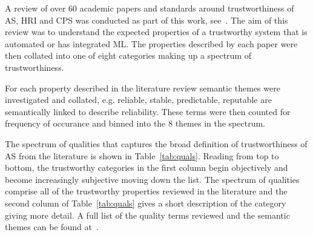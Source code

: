 A review of over 60 academic papers and standards around trustworthiness of AS, HRI and CPS was conducted as part of this work, see~\cite{tsl_git}. The aim of this review was to understand the expected properties of a trustworthy system that is automated or has integrated ML. The properties described by each paper were then collated into one of eight categories making up a spectrum of trustworthiness.

For each property described in the literature review semantic themes were investigated and collated, e.g. reliable, stable, predictable, reputable are semantically linked to describe reliability. These terms were then counted for frequency of occurance and binned into the 8 themes in the spectrum.

The spectrum of qualities that captures the broad definition of trustworthiness of AS from the literature is shown in Table~\ref{tab:quals}. Reading from top to bottom, the trustworthy categories in the first column begin objectively and become increasingly subjective moving down the list. The spectrum of qualities comprise all of the trustworthy properties reviewed in the literature and the second column of Table~\ref{tab:quals} gives a short description of the category giving more detail. A full list of the quality terms reviewed and the semantic themes can be found at~\cite{tsl_git}.

